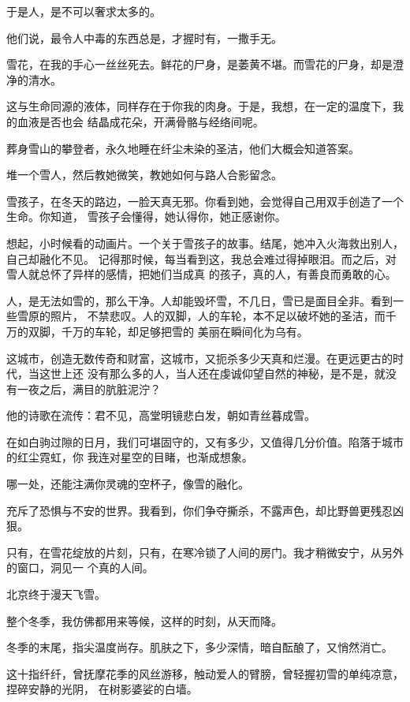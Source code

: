 		于是人，是不可以奢求太多的。\par
		他们说，最令人中毒的东西总是，才握时有，一撒手无。

		雪花，在我的手心一丝丝死去。鲜花的尸身，是萎黄不堪。而雪花的尸身，却是澄净的清水。

		这与生命同源的液体，同样存在于你我的肉身。于是，我想，在一定的温度下，我的血液是否也会
	结晶成花朵，开满骨骼与经络间呢。

		葬身雪山的攀登者，永久地睡在纤尘未染的圣洁，他们大概会知道答案。

		堆一个雪人，然后教她微笑，教她如何与路人合影留念。

		雪孩子，在冬天的路边，一脸天真无邪。你看到她，会觉得自己用双手创造了一个生命。你知道，
	雪孩子会懂得，她认得你，她正感谢你。

		想起，小时候看的动画片。一个关于雪孩子的故事。结尾，她冲入火海救出别人，自己却融化不见。
	记得那时候，每当看到这，我总会难过得掉眼泪。而之后，对雪人就总怀了异样的感情，把她们当成真
	的孩子，真的人，有善良而勇敢的心。

		人，是无法如雪的，那么干净。人却能毁坏雪，不几日，雪已是面目全非。看到一些雪原的照片，
	不禁悲叹。人的双脚，人的车轮，本不足以破坏她的圣洁，而千万的双脚，千万的车轮，却足够把雪的
	美丽在瞬间化为乌有。

		这城市，创造无数传奇和财富，这城市，又扼杀多少天真和烂漫。在更远更古的时代，当这世上还
	没有那么多的人，当人还在虔诚仰望自然的神秘，是不是，就没有一夜之后，满目的肮脏泥泞？

		他的诗歌在流传：君不见，高堂明镜悲白发，朝如青丝暮成雪。

		在如白驹过隙的日月，我们可堪固守的，又有多少，又值得几分价值。陷落于城市的红尘霓虹，你
	我连对星空的目睹，也渐成想象。

		哪一处，还能注满你灵魂的空杯子，像雪的融化。

		充斥了恐惧与不安的世界。我看到，你们争夺撕杀，不露声色，却比野兽更残忍凶狠。

		只有，在雪花绽放的片刻，只有，在寒冷锁了人间的房门。我才稍微安宁，从另外的窗口，洞见一
	个真的人间。

		北京终于漫天飞雪。

		整个冬季，我仿佛都用来等候，这样的时刻，从天而降。

	\endwriting




		冬季的末尾，指尖温度尚存。肌肤之下，多少深情，暗自酝酿了，又悄然消亡。

		这十指纤纤，曾抚摩花季的风丝游移，触动爱人的臂膀，曾轻握初雪的单纯凉意，捏碎安静的光阴，
	在树影婆娑的白墙。

